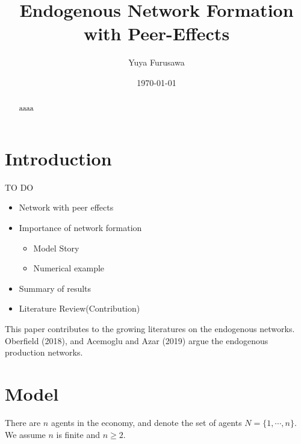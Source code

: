 \documentclass[12pt]{article}
\theoremstyle{definition}
\begin{document}
\title{Endogenous Network Formation with Peer-Effects}

\author{Yuya Furusawa}

\date{\today}

\maketitle

\begin{abstract}
aaaa
\end{abstract}


\section{Introduction}

TO DO
\begin{itemize}
	\item Network with peer effects
	\item Importance of network formation
	\begin{itemize}
 		\item Model Story
 		\item Numerical example
 	\end{itemize}
 	\item Summary of results
  	\item Literature Review(Contribution)
\end{itemize}


This paper contributes to the growing literatures on the endogenous networks.
Oberfield (2018), and Acemoglu and Azar (2019) argue the endogenous production networks.



\section{Model}

There are $n$ agents in the economy, and denote the set of agents $N = \{ 1, \cdots, n\}$.
We assume $n$ is finite and $n \ge 2$.
\end{document}
